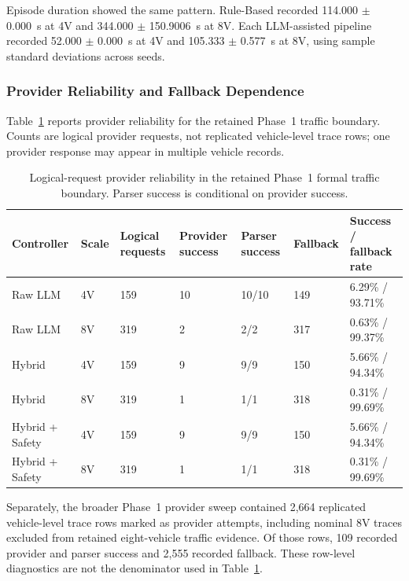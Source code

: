 \documentclass[letterpaper,10pt,conference]{ieeeconf}
\begin{document}
Episode duration showed the same pattern. Rule-Based recorded 114.000 $\pm$ 0.000~s at 4V and 344.000 $\pm$ 150.9006~s at 8V. Each LLM-assisted pipeline recorded 52.000 $\pm$ 0.000~s at 4V and 105.333 $\pm$ 0.577~s at 8V, using sample standard deviations across seeds.



\subsubsection{Provider Reliability and Fallback Dependence}



Table~\ref{tab:provider_reliability} reports provider reliability for the retained Phase~1 traffic boundary. Counts are logical provider requests, not replicated vehicle-level trace rows; one provider response may appear in multiple vehicle records.

\begin{table}[t]
\centering
\caption{Logical-request provider reliability in the retained Phase~1 formal traffic boundary. Parser success is conditional on provider success.}
\label{tab:provider_reliability}
\scriptsize
\renewcommand{\arraystretch}{1.08}
\begin{tabular}{p{2.2cm} p{0.7cm} p{1.6cm} p{1.6cm} p{1.45cm} p{1.25cm} p{2.25cm}}
\toprule
Controller & Scale & Logical requests & Provider success & Parser success & Fallback & Success / fallback rate \\
\midrule
Raw LLM & 4V & 159 & 10 & 10/10 & 149 & 6.29\% / 93.71\% \\
Raw LLM & 8V & 319 & 2 & 2/2 & 317 & 0.63\% / 99.37\% \\
Hybrid & 4V & 159 & 9 & 9/9 & 150 & 5.66\% / 94.34\% \\
Hybrid & 8V & 319 & 1 & 1/1 & 318 & 0.31\% / 99.69\% \\
Hybrid + Safety & 4V & 159 & 9 & 9/9 & 150 & 5.66\% / 94.34\% \\
Hybrid + Safety & 8V & 319 & 1 & 1/1 & 318 & 0.31\% / 99.69\% \\
\bottomrule
\end{tabular}
\end{table}

Separately, the broader Phase~1 provider sweep contained 2,664 replicated vehicle-level trace rows marked as provider attempts, including nominal 8V traces excluded from retained eight-vehicle traffic evidence. Of those rows, 109 recorded provider and parser success and 2,555 recorded fallback. These row-level diagnostics are not the denominator used in Table~\ref{tab:provider_reliability}.
\end{document}
